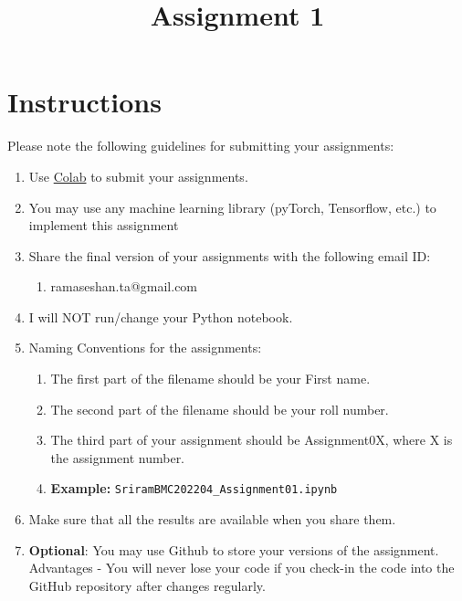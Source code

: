     


    \title{Assignment 1}
    \date{}
    
        \section{Instructions}
        Please note the following guidelines for submitting your assignments:
        \begin{enumerate}
            \item Use \href{https://colab.research.google.com}{Colab}  to submit your assignments.
            \item You may use  any machine learning library (pyTorch, Tensorflow, etc.) to implement this assignment
            \item Share the final version of your assignments with the following email ID:
            \begin{enumerate}
                \item  ramaseshan.ta@gmail.com
            \end{enumerate}

            \item I will NOT run/change your Python notebook.
            \item Naming Conventions for the assignments:
            \begin{enumerate}
                \item The first part of the filename should be your First name.
                \item The second part of the filename should be your roll number.
                \item The third part of your assignment should be Assignment0X, where X is the assignment number.
                \item[] \textbf{Example:} \verb|SriramBMC202204_Assignment01.ipynb|
            \end{enumerate}
            \item Make sure that all the results are available when you share them.
            \item \textbf{Optional}: You may use Github to store your versions of the assignment. Advantages - You will never lose your code if you check-in the code into the GitHub repository after changes regularly.
        \end{enumerate}
        \pagebreak
